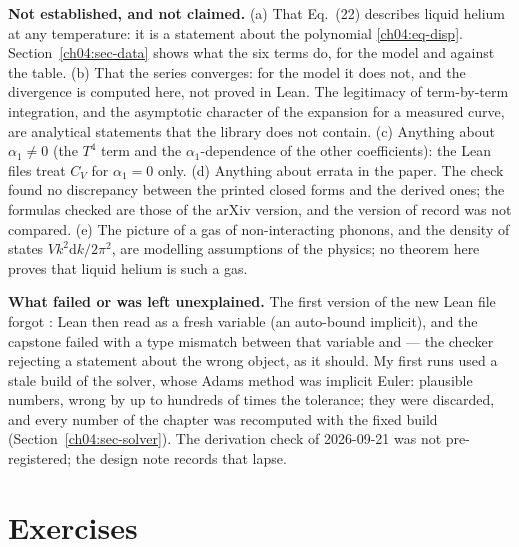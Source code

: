 \begin{honestbox}
\textbf{Not established, and not claimed.}
(a) That Eq.~(22) describes liquid helium at any temperature: it is a statement about the polynomial \eqref{ch04:eq-disp}. Section~\ref{ch04:sec-data} shows what the six terms do, for the model and against the table.
(b) That the series converges: for the model it does not, and the divergence is computed here, not proved in Lean. The legitimacy of term-by-term integration, and the asymptotic character of the expansion for a measured curve, are analytical statements that the library does not contain.
(c) Anything about $\alpha_1\ne0$ (the $T^4$ term and the $\alpha_1$-dependence of the other coefficients): the Lean files treat $C_V$ for $\alpha_1=0$ only.
(d) Anything about errata in the paper. The check found no discrepancy between the printed closed forms and the derived ones; the formulas checked are those of the arXiv version, and the version of record was not compared.
(e) The picture of a gas of non-interacting phonons, and the density of states $V k^2\mathrm dk/2\pi^2$, are modelling assumptions of the physics; no theorem here proves that liquid helium is such a gas.

\textbf{What failed or was left unexplained.}
The first version of the new Lean file forgot : Lean then read  as a fresh variable (an auto-bound implicit), and the capstone failed with a type mismatch between that variable and  --- the checker rejecting a statement about the wrong object, as it should.
My first runs used a stale build of the solver, whose Adams method was implicit Euler: plausible numbers, wrong by up to hundreds of times the tolerance; they were discarded, and every number of the chapter was recomputed with the fixed build (Section~\ref{ch04:sec-solver}).
The derivation check of 2026-09-21 was not pre-registered; the design note records that lapse.
\end{honestbox}

\section*{Exercises}

